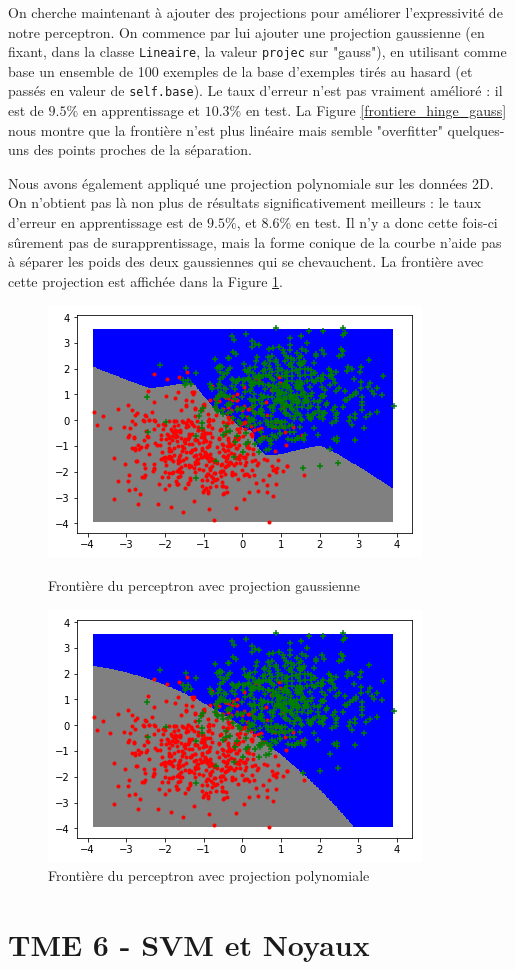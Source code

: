 \documentclass[a4paper]{article}
\begin{document}
On cherche maintenant à ajouter des projections pour améliorer l'expressivité de notre perceptron. On commence par lui ajouter une projection gaussienne (en fixant, dans la classe \verb!Lineaire!, la valeur \verb!projec! sur "gauss"), en utilisant comme base un ensemble de 100 exemples de la base d'exemples tirés au hasard (et passés en valeur de \verb!self.base!). Le taux d'erreur n'est pas vraiment amélioré : il est de $9.5\%$ en apprentissage et $10.3\%$ en test. La Figure \ref{frontiere_hinge_gauss} nous montre que la frontière n'est plus linéaire mais semble "overfitter" quelques-uns des points proches de la séparation.

Nous avons également appliqué une projection polynomiale sur les données 2D. On n'obtient pas là non plus de résultats significativement meilleurs : le taux d'erreur en apprentissage est de $9.5\%$, et $8.6\%$ en test. Il n'y a donc cette fois-ci sûrement pas de surapprentissage, mais la forme conique de la courbe n'aide pas à séparer les poids des deux gaussiennes qui se chevauchent. La frontière avec cette projection est affichée dans la Figure \ref{frontiere_hinge_poly}.

\begin{figure}[ht!]
\begin{center}
\begin{minipage}{0.45\textwidth}
\includegraphics[scale=0.5]{frontiere_hinge_gauss.png}
\caption{Frontière du perceptron avec projection gaussienne}
\label{frontiere_hinge_gauss}
\end{minipage}\hfill
\begin{minipage}{0.45\textwidth}
\includegraphics[scale=0.5]{frontiere_hinge_poly.png}
\caption{Frontière du perceptron avec projection polynomiale}
\label{frontiere_hinge_poly}
\end{minipage}
\end{center}
\end{figure}

\section*{TME 6 - SVM et Noyaux}
\end{document}
